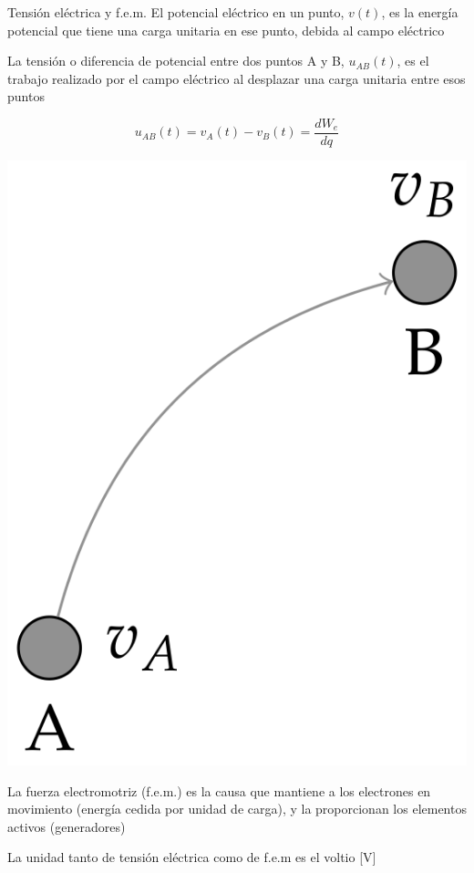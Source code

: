 \documentclass[aspectratio=169, xcolor={usenames,svgnames,dvipsnames}]{beamer}
\begin{document}
\begin{frame}{Tensión eléctrica y f.e.m.}
    El \alert{potencial eléctrico en un punto}, \(v(t)\),  es la energía potencial que tiene una carga unitaria en ese punto, debida al campo eléctrico
    
    La \alert{tensión} o \alert{diferencia de potencial entre dos puntos} A y B, \(u_{AB}(t)\), es el trabajo realizado por el campo eléctrico al desplazar una carga unitaria entre esos puntos
    
    \begin{minipage}[c]{0.5\linewidth}
    \begin{equation*}
      u_{AB}(t) = v_A(t) - v_B(t) = \frac{dW_{e}}{dq}
    \end{equation*}
    \end{minipage}
    \hfill
    \begin{minipage}[c]{0.4\linewidth}
    \begin{center}
    \includegraphics[height=0.3\textheight]{../figs/tension_puntos.PNG}
    \end{center}
    \end{minipage}
    
    La \alert{fuerza electromotriz} (f.e.m.) es la causa que mantiene a los electrones en movimiento (energía cedida por unidad de carga), y la proporcionan los elementos activos (\alert{generadores})
    
    La \alert{unidad} tanto de tensión eléctrica como de f.e.m es el \alert{voltio} [V]
\end{frame}
\end{document}
